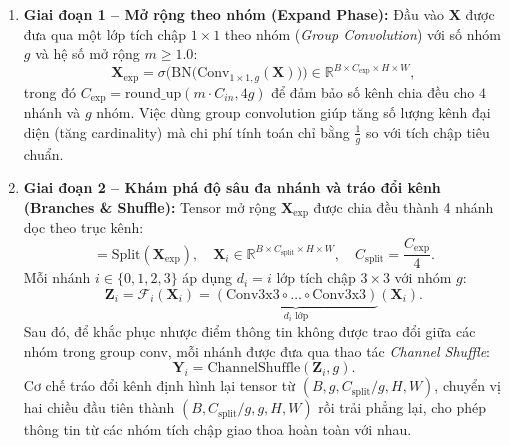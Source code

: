 \documentclass[fontsize=13pt,a4paper,oneside,DIV=calc,chapterprefix=true]{scrbook}
\begin{document}
\begin{enumerate}[leftmargin=1.2cm]
    \item \textbf{Giai đoạn 1 -- Mở rộng theo nhóm (Expand Phase):}
    Đầu vào $\mathbf{X}$ được đưa qua một lớp tích chập $1 \times 1$ theo nhóm (\textit{Group Convolution}) với số nhóm $g$ và hệ số mở rộng $m \ge 1.0$:
    \begin{equation}
    \mathbf{X}_{\exp} = \sigma\Big(\mathrm{BN}\big(\mathrm{Conv}_{1\times 1, g}(\mathbf{X})\big)\Big) \in \mathbb{R}^{B \times C_{\exp} \times H \times W},
    \end{equation}
    trong đó $C_{\exp} = \mathrm{round\_up}(m \cdot C_{in}, 4g)$ để đảm bảo số kênh chia đều cho $4$ nhánh và $g$ nhóm. Việc dùng group convolution giúp tăng số lượng kênh đại diện (tăng cardinality) mà chi phí tính toán chỉ bằng $\frac{1}{g}$ so với tích chập tiêu chuẩn.
    
    \item \textbf{Giai đoạn 2 -- Khám phá độ sâu đa nhánh và tráo đổi kênh (Branches \& Shuffle):}
    Tensor mở rộng $\mathbf{X}_{\exp}$ được chia đều thành 4 nhánh dọc theo trục kênh:
    \begin{equation}
    [\mathbf{X}_0, \mathbf{X}_1, \mathbf{X}_2, \mathbf{X}_3] = \mathrm{Split}(\mathbf{X}_{\exp}), \quad \mathbf{X}_i \in \mathbb{R}^{B \times C_{\text{split}} \times H \times W}, \quad C_{\text{split}} = \frac{C_{\exp}}{4}.
    \end{equation}
    Mỗi nhánh $i \in \{0, 1, 2, 3\}$ áp dụng $d_i = i$ lớp tích chập $3 \times 3$ với nhóm $g$:
    \begin{equation}
    \mathbf{Z}_i = \mathcal{F}_i(\mathbf{X}_i) = \underbrace{(\mathrm{Conv3x3} \circ \dots \circ \mathrm{Conv3x3})}_{d_i \text{ lớp}}(\mathbf{X}_i).
    \end{equation}
    Sau đó, để khắc phục nhược điểm thông tin không được trao đổi giữa các nhóm trong group conv, mỗi nhánh được đưa qua thao tác \textit{Channel Shuffle}:
    \begin{equation}
    \mathbf{Y}_i = \mathrm{ChannelShuffle}(\mathbf{Z}_i, g).
    \end{equation}
    Cơ chế tráo đổi kênh định hình lại tensor từ $(B, g, C_{\text{split}}/g, H, W)$, chuyển vị hai chiều đầu tiên thành $(B, C_{\text{split}}/g, g, H, W)$ rồi trải phẳng lại, cho phép thông tin từ các nhóm tích chập giao thoa hoàn toàn với nhau.
    

\end{enumerate}
\end{document}
